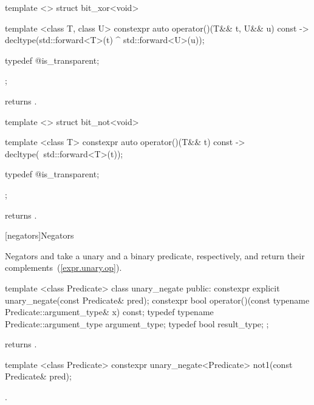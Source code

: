 %
\begin{itemdecl}
template <> struct bit_xor<void> {
  template <class T, class U> constexpr auto operator()(T&& t, U&& u) const
    -> decltype(std::forward<T>(t) ^ std::forward<U>(u));

  typedef @\unspec@ is_transparent;
};
\end{itemdecl}

\begin{itemdescr}
\pnum
{} returns .
\end{itemdescr}

%
\begin{itemdecl}
template <> struct bit_not<void> {
  template <class T> constexpr auto operator()(T&& t) const
    -> decltype(~std::forward<T>(t));

  typedef @\unspec@ is_transparent;
};
\end{itemdecl}

\begin{itemdescr}
\pnum
{} returns .
\end{itemdescr}

[negators]{Negators}

\pnum
Negators  and  take a unary and a binary predicate,
respectively, and return their complements~(\ref{expr.unary.op}).

%
\begin{itemdecl}
template <class Predicate>
  class unary_negate {
public:
  constexpr explicit unary_negate(const Predicate& pred);
  constexpr bool operator()(const typename Predicate::argument_type& x) const;
  typedef typename Predicate::argument_type argument_type;
  typedef bool result_type;
};
\end{itemdecl}

\begin{itemdescr}
\pnum
{} returns .
\end{itemdescr}

%
\begin{itemdecl}
template <class Predicate>
  constexpr unary_negate<Predicate> not1(const Predicate& pred);
\end{itemdecl}

\begin{itemdescr}
\pnum
\returns
{}.
\end{itemdescr}

